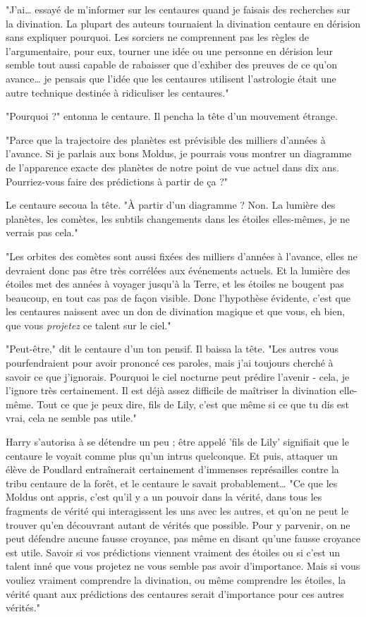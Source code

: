 "J'ai… essayé de m'informer sur les centaures quand je faisais des recherches sur la divination. La plupart des auteurs tournaient la divination centaure en dérision sans expliquer pourquoi. Les sorciers ne comprennent pas les règles de l'argumentaire, pour eux, tourner une idée ou une personne en dérision leur semble tout aussi capable de rabaisser que d'exhiber des preuves de ce qu'on avance… je pensais que l'idée que les centaures utilisent l'astrologie était une autre technique destinée à ridiculiser les centaures."

"Pourquoi ?" entonna le centaure. Il pencha la tête d'un mouvement étrange.

"Parce que la trajectoire des planètes est prévisible des milliers d'années à l'avance. Si je parlais aux bons Moldus, je pourrais vous montrer un diagramme de l'apparence exacte des planètes de notre point de vue actuel dans dix ans. Pourriez-vous faire des prédictions à partir de ça ?"

Le centaure secoua la tête. "À partir d'un diagramme ? Non. La lumière des planètes, les comètes, les subtils changements dans les étoiles elles-mêmes, je ne verrais pas cela."

"Les orbites des comètes sont aussi fixées des milliers d'années à l'avance, elles ne devraient donc pas être très corrélées aux événements actuels. Et la lumière des étoiles met des années à voyager jusqu'à la Terre, et les étoiles ne bougent pas beaucoup, en tout cas pas de façon visible. Donc l'hypothèse évidente, c'est que les centaures naissent avec un don de divination magique et que vous, eh bien, que vous \emph{projetez}  ce talent sur le ciel."

"Peut-être," dit le centaure d'un ton pensif. Il baissa la tête. "Les autres vous pourfendraient pour avoir prononcé ces paroles, mais j'ai toujours cherché à savoir ce que j'ignorais. Pourquoi le ciel nocturne peut prédire l'avenir - cela, je l'ignore très certainement. Il est déjà assez difficile de maîtriser la divination elle-même. Tout ce que je peux dire, fils de Lily, c'est que même si ce que tu dis est vrai, cela ne semble pas utile."

Harry s'autorisa à se détendre un peu ; être appelé 'fils de Lily' signifiait que le centaure le voyait comme plus qu'un intrus quelconque. Et puis, attaquer un élève de Poudlard entraînerait certainement d'immenses représailles contre la tribu centaure de la forêt, et le centaure le savait probablement… "Ce que les Moldus ont appris, c'est qu'il y a un pouvoir dans la vérité, dans tous les fragments de vérité qui interagissent les uns avec les autres, et qu'on ne peut le trouver qu'en découvrant autant de vérités que possible. Pour y parvenir, on ne peut défendre aucune fausse croyance, pas même en disant qu'une fausse croyance est utile. Savoir si vos prédictions viennent vraiment des étoiles ou si c'est un talent inné que vous projetez ne vous semble pas avoir d'importance. Mais si vous vouliez vraiment comprendre la divination, ou même comprendre les étoiles, la vérité quant aux prédictions des centaures serait d'importance pour ces autres vérités."

